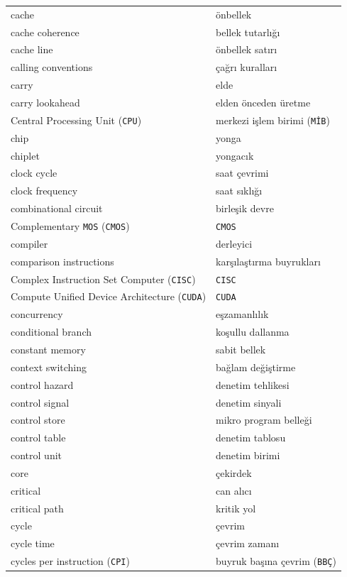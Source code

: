 {\begin{longtable}{@{}p{7.6cm}p{7.6cm}@{}}
cache & önbellek \\
cache coherence & bellek tutarlığı \\
cache line & önbellek satırı \\
calling conventions & çağrı kuralları \\
carry & elde \\
carry lookahead & elden önceden üretme \\
Central Processing Unit (\texttt{CPU}) & merkezi işlem birimi (\texttt{MİB}) \\
chip & yonga \\
chiplet & yongacık \\
clock cycle & saat çevrimi \\
clock frequency & saat sıklığı \\
combinational circuit & birleşik devre \\
Complementary \texttt{MOS} (\texttt{CMOS}) & \texttt{CMOS} \\
compiler & derleyici \\
comparison instructions & karşılaştırma buyrukları \\
Complex Instruction Set Computer (\texttt{CISC}) & \texttt{CISC} \\
Compute Unified Device Architecture (\texttt{CUDA}) & \texttt{CUDA} \\
concurrency & eşzamanlılık \\
conditional branch & koşullu dallanma \\
constant memory & sabit bellek \\
context switching & bağlam değiştirme \\
control hazard & denetim tehlikesi \\
control signal & denetim sinyali \\
control store & mikro program belleği \\
control table & denetim tablosu \\
control unit & denetim birimi \\
core & çekirdek \\
critical & can alıcı \\
critical path & kritik yol \\
cycle & çevrim \\
cycle time & çevrim zamanı \\
cycles per instruction (\texttt{CPI}) & buyruk başına çevrim (\texttt{BBÇ}) \\


\end{longtable}}
